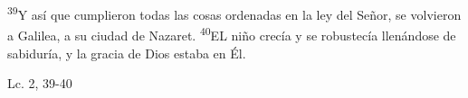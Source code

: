 \documentclass[../../rosario.tex]{subfiles}
\begin{document}
    \textsuperscript{39}Y así que cumplieron todas las cosas ordenadas en la ley del Señor, se volvieron a Galilea, a su ciudad de Nazaret. \textsuperscript{40}EL niño crecía
    y se robustecía llenándose de sabiduría, y la gracia de Dios estaba en Él.
    \begin{flushright}
    Lc. 2, 39-40         
    \end{flushright}
\end{document}
